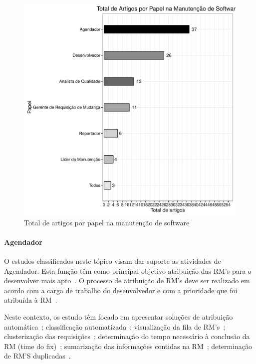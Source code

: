 \begin{figure}[htpb]
	\centering
	\includegraphics[width=0.8\linewidth]{chapter-mapeamento-sistematico/img/grafico_papel_por_artigo.pdf}
	\caption{Total de artigos por papel na manutenção de software}
	\label{fig:graf_papel_por_artigo}
\end{figure}

\paragraph{Agendador}
O estudos classificados neste tópico visam dar suporte as atividades de
Agendador. Esta função têm como principal objetivo atribuição das RM’s
para o desenvolver mais apto~\cite{banitaan2013decoba}. O processo de atribuição
de RM's deve ser realizado em acordo com a carga de trabalho do desenvolvedor e
com a prioridade que foi atribuída à RM~\cite{chawla2015automated}. 

Neste contexto, os estudo têm focado em apresentar soluções de atribuição
automática~\cite{banitaan2013decoba, shokripour2012automatic,
	somasundaram2012automatici,Naguib2013, Zhang2014, Zanetti2013}; classificação
automatizada~\cite{gegick2010identifying,liu2014faceted, behl2014bug,
	chawla2015automated,tian2015automated}; visualização da
fila de RM's~\cite{izquierdo2015gila}; clusterização das
requisições~\cite{liu2014faceted}; determinação do tempo necessário à conclusão
da RM (time do fix)~\cite{hosseini2012market,
	Bhattacharya:2011:BTP:1985441.1985472}; sumarização das informações
contidas na RM~\cite{mani2012ausum}; determinação de RM'S
duplicadas~\cite{Sun2011, Wu2011a}.

